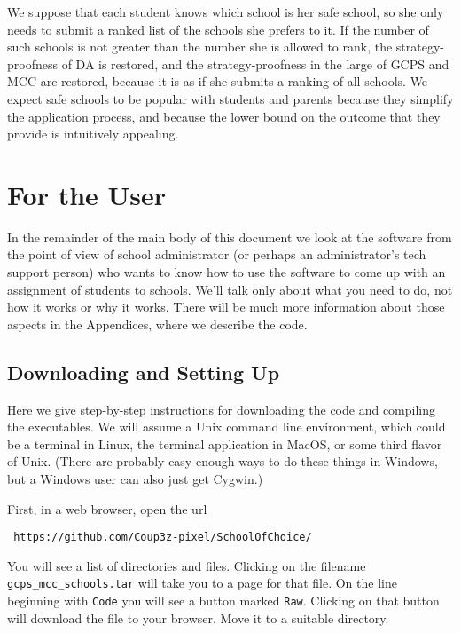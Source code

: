 \documentclass[12pt]{article}
\theoremstyle{definition}
\begin{document}
We suppose that each student knows which school is her safe school, so
she only needs to submit a ranked list of the schools she prefers to
it. If the number of such schools is not greater than the number she
is allowed to rank, the strategy-proofness of DA is restored, and the
strategy-proofness in the large of GCPS and MCC are restored, because
it is as if she submits a ranking of all schools.  We expect safe
schools to be popular with students and parents because they simplify
the application process, and because the lower bound on the outcome
that they provide is intuitively appealing.

\section{For the User}

In the remainder of the main body of this document we look at the
software from the point of view of school administrator (or perhaps an
administrator's tech support person) who wants to know how to use the
software to come up with an assignment of students to schools.  We'll
talk only about what you need to do, not how it works or why it works.
There will be much more information about those aspects in the
Appendices, where we describe the code.

\subsection{Downloading and Setting Up} \label{subsec:DownloadInstall}

Here we give step-by-step instructions for downloading the code and
compiling the executables.  We will assume a Unix command line
environment, which could be a terminal in Linux, the terminal
application in MacOS, or some third flavor of Unix.  (There are
probably easy enough ways to do these things in Windows, but a Windows
user can also just get Cygwin.)

First, in a web browser, open the url
\begin{obeylines}
  \texttt{
    https://github.com/Coup3z-pixel/SchoolOfChoice/
    }
\end{obeylines}

\bigskip \noindent You will see a list of directories and files.
Clicking on the filename \texttt{gcps\_mcc\_schools.tar} will take you
to a page for that file.  On the line beginning with \texttt{Code} you
will see a button marked \texttt{Raw}.  Clicking on that button will
download the file to your browser.  Move it to a suitable directory.
\end{document}
